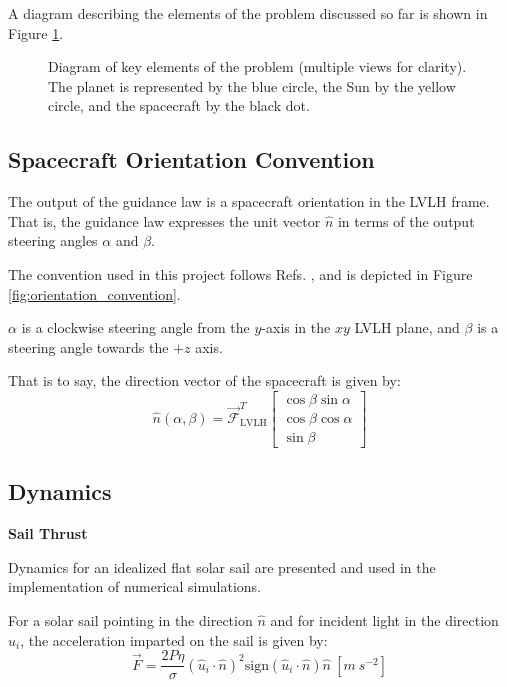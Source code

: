 A diagram describing the elements of the problem discussed so far is shown in Figure \ref{fig:problem_setup}.
\begin{figure}[H]
    \centering
    
    
    \caption{Diagram of key elements of the problem (multiple views for clarity). The planet is represented by the blue circle, the Sun by the yellow circle, and the spacecraft by the black dot.}
    \label{fig:problem_setup}
\end{figure}


\subsection{Spacecraft Orientation Convention}
The output of the guidance law is a spacecraft orientation in the LVLH frame. That is, the guidance law expresses the unit vector $\hat{n}$ in terms of the output steering angles $\alpha$ and $\beta$.

The convention used in this project follows Refs. \cite{petropoulos2004low, vargaperez2016, sanjeev2023}, and is depicted in Figure \ref{fig:orientation_convention}.


$\alpha$ is a clockwise steering angle from the $y$-axis in the $xy$ LVLH plane, and $\beta$ is a steering angle towards the $+z$ axis.

That is to say, the direction vector of the spacecraft is given by:
\begin{equation}
    \hat{n}(\alpha, \beta) = \mathcal{\vec{F}}_{\text{LVLH}}^T
    \begin{bmatrix}
        \cos \beta \sin \alpha\\
        \cos \beta \cos \alpha\\
        \sin \beta
    \end{bmatrix}
    \label{eq:alpha_beta_n}
\end{equation}


\subsection{Dynamics}
\textbf{Sail Thrust}

Dynamics for an idealized flat solar sail are presented and used in the implementation of numerical simulations.

For a solar sail pointing in the direction $\hat{n}$ and for incident light in the direction $\hat{u}_i$, the acceleration imparted on the sail is given by:
\begin{equation}
    \vec{F} = \frac{2 P \eta}{\sigma}(\hat{u}_i \cdot \hat{n})^2 \mathrm{sign}(\hat{u}_i \cdot \hat{n}) \hat{n} 
 \ [\unit{m\ s^{-2}}] \label{eq:solar_force}
\end{equation}

